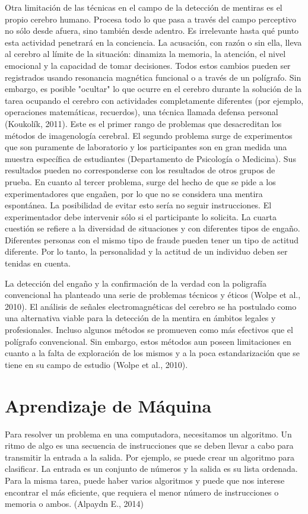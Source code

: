 Otra limitación de las técnicas en el campo de la detección de mentiras es el propio cerebro humano. Procesa todo lo que pasa a través del campo perceptivo no sólo desde afuera, sino también desde adentro. Es irrelevante hasta qué punto esta actividad penetrará en la conciencia. La acusación, con razón o sin ella, lleva al cerebro al límite de la situación: dinamiza la memoria, la atención, el nivel emocional y la capacidad de tomar decisiones. Todos estos cambios pueden ser registrados usando resonancia magnética funcional o a través de un polígrafo. Sin embargo, es posible "ocultar" lo que ocurre en el cerebro durante la solución de la tarea ocupando el cerebro con actividades completamente diferentes (por ejemplo, operaciones matemáticas, recuerdos), una técnica llamada defensa personal (Koukolík, 2011). Este es el primer rango de problemas que desacreditan los métodos de imagenología cerebral. El segundo problema surge de experimentos que son puramente de laboratorio y los participantes son en gran medida una muestra específica de estudiantes (Departamento de Psicología o Medicina). Sus resultados pueden no corresponderse con los resultados de otros grupos de prueba. En cuanto al tercer problema, surge del hecho de que se pide a los experimentadores que engañen, por lo que no se considera una mentira espontánea. La posibilidad de evitar esto sería no seguir instrucciones. El experimentador debe intervenir sólo si el participante lo solicita. La cuarta cuestión se refiere a la diversidad de situaciones y con diferentes tipos de engaño. Diferentes personas con el mismo tipo de fraude pueden tener un tipo de actitud diferente. Por lo tanto, la personalidad y la actitud de un individuo deben ser tenidas en cuenta.

La detección del engaño y la confirmación de la verdad con la poligrafía convencional ha planteado una serie de problemas técnicos y éticos (Wolpe et al., 2010).  El análisis de señales electromagnéticas del cerebro se ha postulado como una alternativa viable para la detección de la mentira en ámbitos legales y profesionales. Incluso algunos métodos se promueven como más efectivos que el polígrafo convencional. Sin embargo, estos métodos aun poseen limitaciones en cuanto a la falta de exploración de los mismos y a la poca estandarización que se tiene en su campo de estudio (Wolpe et al., 2010). 

\section{Aprendizaje de Máquina}
Para resolver un problema en una computadora, necesitamos un algoritmo.  Un ritmo de algo es una secuencia de instrucciones que se deben llevar a cabo para transmitir la entrada a la salida.  Por ejemplo, se puede crear un algoritmo para clasificar.  La entrada es un conjunto de números y la salida es su lista ordenada.  Para la misma tarea, puede haber varios algoritmos y puede que nos interese encontrar el más eficiente, que requiera el menor número de instrucciones o memoria o ambos. (Alpaydn E., 2014)

